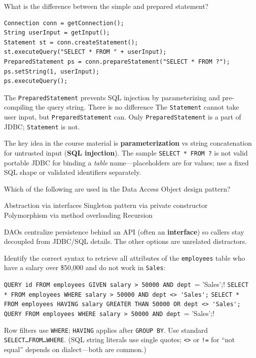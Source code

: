 \newpage

\question[4]
What is the difference between the simple and prepared statement?
\begin{lstlisting}[style=java]
Connection conn = getConnection();
String userInput = getInput(); 
Statement st = conn.createStatement();
st.executeQuery("SELECT * FROM " + userInput);
PreparedStatement ps = conn.prepareStatement("SELECT * FROM ?");
ps.setString(1, userInput);
ps.executeQuery();
\end{lstlisting}
\begin{choices}
  \CorrectChoice The \texttt{PreparedStatement} prevents SQL injection by parameterizing and pre-compiling the query string.
  \choice There is no difference
  \choice The \texttt{Statement} cannot take user input, but \texttt{PreparedStatement} can.
  \choice Only \texttt{PreparedStatement} is a part of JDBC; \texttt{Statement} is not.
\end{choices}
\begin{solution}
  The key idea in the course material is \textbf{parameterization} vs string concatenation for untrusted input (\textbf{SQL injection}). The sample \texttt{SELECT * FROM ?} is not valid portable JDBC for binding a \emph{table} name---placeholders are for values; use a fixed SQL shape or validated identifiers separately.
\end{solution}

\question[4]
Which of the following are used in the Data Access Object design pattern?
\begin{choices}
  \CorrectChoice Abstraction via interfaces
  \choice Singleton pattern via private constructor
  \choice Polymorphism via method overloading
  \choice Recursion
\end{choices}
\begin{solution}
  DAOs centralize persistence behind an API (often an \textbf{interface}) so callers stay decoupled from JDBC/SQL details. The other options are unrelated distractors.
\end{solution}

\question[4]
Identify the correct syntax to retrieve all attributes of the \texttt{employees} table who have a salary over \$50{,}000 and do not work in \texttt{Sales}:
\begin{choices}
  \choice \lstinline[style=sqlinline]!QUERY id FROM employees GIVEN salary > 50000 AND dept != 'Sales';!
  \CorrectChoice \lstinline[style=sqlinline]!SELECT * FROM employees WHERE salary > 50000 AND dept <> 'Sales';!
  \choice \lstinline[style=sqlinline]!SELECT * FROM employees HAVING salary GREATER THAN 50000 OR dept <> 'Sales';!
  \choice \lstinline[style=sqlinline]!QUERY FROM employees WHERE salary > 50000 AND dept != 'Sales';!
\end{choices}
\begin{solution}
  Row filters use \texttt{WHERE}; \texttt{HAVING} applies after \texttt{GROUP BY}. Use standard \\
  \texttt{SELECT\ldots FROM\ldots WHERE}. (SQL string literals use single quotes; \texttt{<>} or \texttt{!=} for ``not equal'' depends on dialect---both are common.)
\end{solution}

